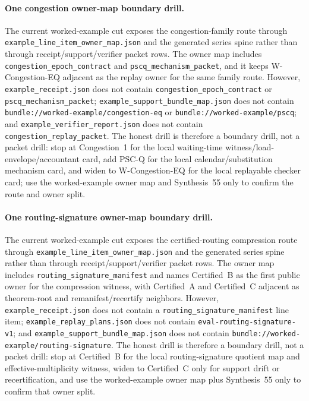 \documentclass[11pt]{article}
\begin{document}
\paragraph{One congestion owner-map boundary drill.}
The current worked-example cut exposes the congestion-family route through \nolinkurl{example\_line\_item\_owner\_map.json} and the generated series spine rather than through receipt/support/verifier packet rows. The owner map includes \nolinkurl{congestion\_epoch\_contract} and \nolinkurl{pscq\_mechanism\_packet}, and it keeps W-Congestion-EQ adjacent as the replay owner for the same family route. However, \nolinkurl{example\_receipt.json} does not contain \nolinkurl{congestion\_epoch\_contract} or \nolinkurl{pscq\_mechanism\_packet}; \nolinkurl{example\_support\_bundle\_map.json} does not contain \nolinkurl{bundle://worked-example/congestion-eq} or \nolinkurl{bundle://worked-example/pscq}; and \nolinkurl{example\_verifier\_report.json} does not contain \nolinkurl{congestion\_replay\_packet}. The honest drill is therefore a boundary drill, not a packet drill: stop at Congestion~1 for the local waiting-time witness/load-envelope/accountant card, add PSC-Q for the local calendar/substitution mechanism card, and widen to W-Congestion-EQ for the local replayable checker card; use the worked-example owner map and Synthesis~55 only to confirm the route and owner split.\cite{series:congestion1,series:pscq,series:wcongestion,series:seriesspines}

\paragraph{One routing-signature owner-map boundary drill.}
The current worked-example cut exposes the certified-routing compression route through \nolinkurl{example\_line\_item\_owner\_map.json} and the generated series spine rather than through receipt/support/verifier packet rows. The owner map includes \nolinkurl{routing\_signature\_manifest} and names Certified~B as the first public owner for the compression witness, with Certified~A and Certified~C adjacent as theorem-root and remanifest/recertify neighbors. However, \nolinkurl{example\_receipt.json} does not contain a \nolinkurl{routing\_signature\_manifest} line item; \nolinkurl{example\_replay\_plans.json} does not contain \nolinkurl{eval-routing-signature-v1}; and \nolinkurl{example\_support\_bundle\_map.json} does not contain \nolinkurl{bundle://worked-example/routing-signature}. The honest drill is therefore a boundary drill, not a packet drill: stop at Certified~B for the local routing-signature quotient map and effective-multiplicity witness, widen to Certified~C only for support drift or recertification, and use the worked-example owner map plus Synthesis~55 only to confirm that owner split.\cite{series:certifiedmenus,series:certifiedB,series:recert,series:seriesspines}
\end{document}
